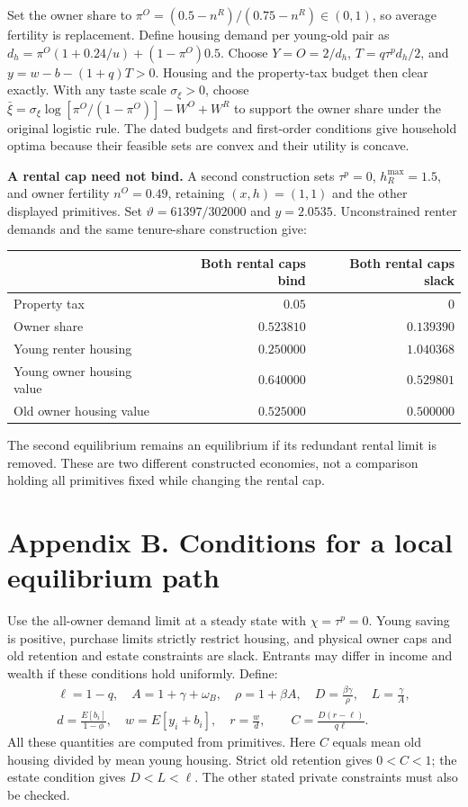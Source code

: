 \documentclass[11pt]{article}
\newcommand{\pageheading}[1]{\section*{#1}}
\begin{document}
Set the owner share to $\pi^O=(0.5-n^R)/(0.75-n^R)\in(0,1)$, so average
fertility is replacement. Define housing demand per young-old pair as
$d_h=\pi^O(1+0.24/u)+(1-\pi^O)0.5$. Choose
$Y=O=2/d_h$, $T=q\tau^p d_h/2$, and $y=w-b-(1+q)T>0$.
Housing and the property-tax budget then clear exactly. With any taste scale
$\sigma_\xi>0$, choose
$\bar\xi=\sigma_\xi\log[\pi^O/(1-\pi^O)]-W^O+W^R$ to support the owner
share under the original logistic rule. The dated budgets and first-order
conditions give household optima because their feasible sets are convex and
their utility is concave.

\textbf{A rental cap need not bind.} A second construction sets
$\tau^p=0$, $h_R^{\max}=1.5$, and owner fertility $n^O=0.49$, retaining
$(x,h)=(1,1)$ and the other displayed primitives. Set
$\vartheta=61397/302000$ and $y=2.0535$. Unconstrained renter demands and the
same tenure-share construction give:
\begin{center}
\begin{tabular}{@{}lrr@{}}
\toprule
 & Both rental caps bind & Both rental caps slack\\
\midrule
Property tax & $0.05$ & $0$\\
Owner share & $0.523810$ & $0.139390$\\
Young renter housing & $0.250000$ & $1.040368$\\
Young owner housing value & $0.640000$ & $0.529801$\\
Old owner housing value & $0.525000$ & $0.500000$\\
\bottomrule
\end{tabular}
\end{center}
The second equilibrium remains an equilibrium if its redundant rental limit
is removed. These are two different constructed economies, not a comparison
holding all primitives fixed while changing the rental cap.


\newpage
\pageheading{Appendix B. Conditions for a local equilibrium path}

Use the all-owner demand limit at a steady state with $\chi=\tau^p=0$. Young saving is
positive, purchase limits strictly restrict housing, and physical owner caps
and old retention and estate constraints are slack. Entrants may differ in
income and wealth if these conditions hold uniformly. Define:
\begin{gather*}
 \ell=1-q,\quad A=1+\gamma+\omega_B,\quad\rho=1+\beta A,
 \quad D=\frac{\beta\gamma}{\rho},\quad L=\frac\gamma A,\\
 d=\frac{E[b_i]}{1-\phi},\quad w=E[y_i+b_i],\quad r=\frac wd,
 \qquad C=\frac{D(r-\ell)}{q\ell}.
\end{gather*}
All these quantities are computed from primitives. Here $C$ equals mean old
housing divided by mean young housing. Strict old retention gives $0<C<1$;
the estate condition gives $D<L<\ell$. The other stated private constraints
must also be checked.
\end{document}
